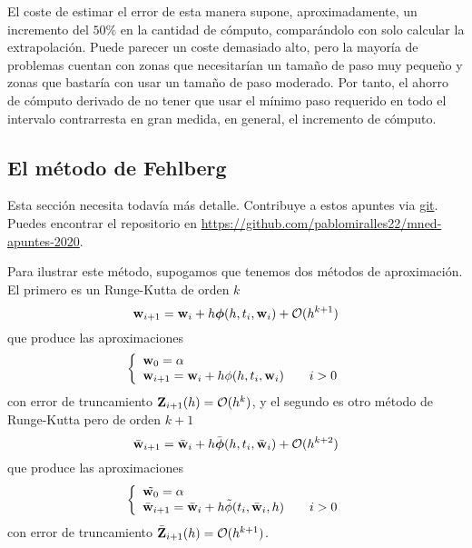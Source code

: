 \begin{remark}
    El coste de estimar el error de esta manera supone, aproximadamente,
    un incremento del $50\%$ en la cantidad de cómputo,
    comparándolo con solo calcular la extrapolación.
    Puede parecer un coste demasiado alto,
    pero la mayoría de problemas cuentan con
    zonas que necesitarían un tamaño de paso muy pequeño
    y zonas que bastaría con usar un tamaño de paso moderado.
    Por tanto, el ahorro de cómputo derivado de no tener que
    usar el mínimo paso requerido en todo el intervalo
    contrarresta en gran medida, en general,
    el incremento de cómputo.
\end{remark}  

\subsection{El método de Fehlberg}

\begin{editorial}
    Esta sección necesita todavía más detalle.
    Contribuye a estos apuntes via \href{https://git-scm.com/}{git}.
    Puedes encontrar el repositorio en
    \url{https://github.com/pablomiralles22/mned-apuntes-2020}.
\end{editorial}

Para ilustrar este método,
supogamos que tenemos dos métodos de aproximación.
El primero es un Runge-Kutta de orden $k$
\begin{equation*}
    \vb{w}{}_{i+1} = \vb{w}{}_i + h\vb*{\phi}{}(h, t_i, \vb{w}{}_i) + \vb{\mathcal{O}}{}(h^{k+1})
\end{equation*}
que produce las aproximaciones
\begin{equation*}
    \left\{
    \begin{array}{lll}
    \vb{w}{}_0 = \alpha & & \\
    \vb{w}{}_{i+1} = \vb{w}{}_i + h\phi(h, t_i, \vb{w}{}_i) & & i >0
    \end{array}
    \right.
\end{equation*}
con error de truncamiento $\vb{Z}{}_{i+1}(h) = \vb{\mathcal{O}}{}(h^k)$,
y el segundo es otro método de Runge-Kutta pero de orden $k+1$
\begin{equation*}
    \bar{\vb{w}{}}_{i+1} = \bar{\vb{w}{}}_i + h\bar{\vb*{\phi}{}}(h, t_i, \bar{\vb{w}{}}_i) + \vb{\mathcal{O}}{}(h^{k+2})
\end{equation*}
que produce las aproximaciones
\begin{equation*}
    \left\{
    \begin{array}{lll}
    \tilde{\vb{w}{}_0} =  \alpha  & & \\
    \bar{\vb{w}{}}_{i+1} = \bar{\vb{w}{}}_i + h\tilde{\phi}(t_i, \bar{\vb{w}{}}_i, h) & & i >0
    \end{array}
    \right.
\end{equation*}
con error de truncamiento $\bar{\vb{Z}{}}_{i+1}(h) = \vb{\mathcal{O}}{}(h^{k+1})$.

